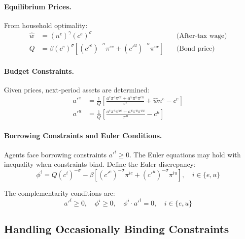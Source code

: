 \paragraph{Equilibrium Prices.}
From household optimality:
\begin{align}
    \hat{w} &= (n^e)^\gamma (c^e)^\sigma \quad &\text{(After-tax wage)} \label{eq:wage_ha}\\
    Q &= \beta (c^e)^\sigma \left[ (c'^e)^{-\sigma} \pi^{ee} + (c'^u)^{-\sigma} \pi^{ue} \right] \quad &\text{(Bond price)} \label{eq:bondprice_ha}
\end{align}

\paragraph{Budget Constraints.}
Given prices, next-period assets are determined:
\begin{align}
    a'^e &= \frac{1}{Q} \left[ \frac{a^e \pi^e \pi^{ee} + a^u \pi^u \pi^{eu}}{\pi^e} + \hat{w} n^e - c^e \right] \label{eq:asset_e}\\
    a'^u &= \frac{1}{Q} \left[ \frac{a^e \pi^e \pi^{ue} + a^u \pi^u \pi^{uu}}{\pi^u} - c^u \right] \label{eq:asset_u}
\end{align}

\paragraph{Borrowing Constraints and Euler Conditions.}
Agents face borrowing constraints $a'^i \geq 0$. The Euler equations may hold with inequality when constraints bind. Define the Euler discrepancy:
\begin{equation}\label{eq:euler_discrepancy}
    \phi^i = Q (c^i)^{-\sigma} - \beta \left[ (c'^e)^{-\sigma} \pi^{ie} + (c'^u)^{-\sigma} \pi^{iu} \right], \quad i \in \{e, u\}
\end{equation}

The complementarity conditions are:
\begin{equation}\label{eq:complementarity}
    a'^i \geq 0, \quad \phi^i \geq 0, \quad \phi^i \cdot a'^i = 0, \quad i \in \{e, u\}
\end{equation}


\subsection{Handling Occasionally Binding Constraints}

